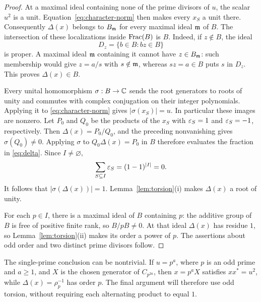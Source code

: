 \begin{proof}
At a maximal ideal containing none of the prime divisors of \(u\),
the scalar \(u^2\) is a unit. Equation~\eqref{eq:character-norm}
then makes every \(x_S\) a unit there. Consequently \(\Delta(x)\)
belongs to \(B_{\mathfrak m}\) for every maximal ideal \(\mathfrak m\) of \(B\).
The intersection of these localizations inside \(\operatorname{Frac}(B)\) is \(B\).
Indeed, if \(z\notin B\), the ideal
\[
 D_z=\{b\in B:bz\in B\}
\]
is proper. A maximal ideal \(\mathfrak m\) containing it cannot have
\(z\in B_{\mathfrak m}\): such membership would give \(z=a/s\) with
\(s\notin\mathfrak m\), whereas \(sz=a\in B\) puts \(s\) in \(D_z\).
This proves \(\Delta(x)\in B\).

Every unital homomorphism \(\sigma:B\to\mathbb C\) sends the root generators to
roots of unity and commutes with complex conjugation on their integer
polynomials. Applying it to \eqref{eq:character-norm} gives
\(|\sigma(x_S)|=u\). In particular these images are nonzero.
Let \(P_0\) and \(Q_0\) be the products of the \(x_S\) with
\(\varepsilon_S=1\) and \(\varepsilon_S=-1\), respectively. Then
\(\Delta(x)=P_0/Q_0\), and the preceding nonvanishing gives
\(\sigma(Q_0)\ne0\). Applying \(\sigma\) to
\(Q_0\Delta(x)=P_0\) in \(B\) therefore evaluates the fraction
in \eqref{eq:delta}.
Since \(I\ne\varnothing\),
\[
 \sum_{S\subseteq I}\varepsilon_S=(1-1)^{|I|}=0.
\]
It follows that \(|\sigma(\Delta(x))|=1\).
Lemma~\ref{lem:torsion}(i) makes \(\Delta(x)\) a root of unity.

For each \(p\in I\), there is a maximal ideal of \(B\) containing
\(p\): the additive group of \(B\) is free of positive finite rank,
so \(B/pB\ne0\). At that ideal \(\Delta(x)\) has residue \(1\), so
Lemma~\ref{lem:torsion}(ii) makes its order a power of \(p\).
The assertions about odd order and two distinct prime divisors follow.
\end{proof}

The single-prime conclusion can be nontrivial. If \(u=p^a\), where
\(p\) is an odd prime and \(a\geq1\), and \(X\) is the chosen generator
of \(C_{p^{2a}}\), then \(x=p^aX\) satisfies \(xx^*=u^2\), while
\(\Delta(x)=\rho_p^{-1}\) has order \(p\). The final argument will
therefore use odd torsion, without requiring each alternating product
to equal \(1\).
